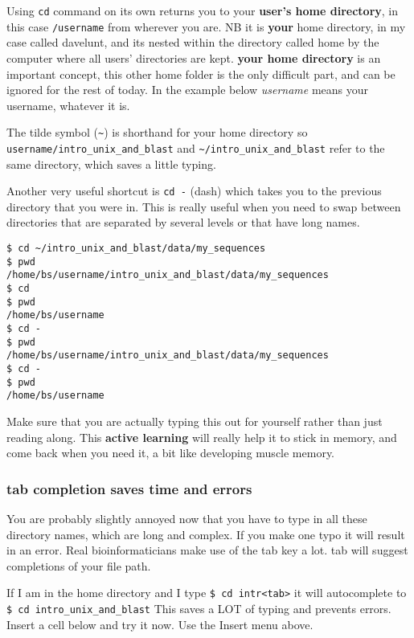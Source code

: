 \documentclass[11pt]{article}
\begin{document}
Using \texttt{cd} command on its own returns you to your \textbf{user's
home directory}, in this case \texttt{/username} from wherever you are.
NB it is \textbf{your} home directory, in my case called davelunt, and
its nested within the directory called home by the computer where all
users' directories are kept. \textbf{your home directory} is an
important concept, this other home folder is the only difficult part,
and can be ignored for the rest of today. In the example below
\emph{username} means your username, whatever it is.

The tilde symbol (\texttt{\textasciitilde{}}) is shorthand for your home
directory so \texttt{username/intro\_unix\_and\_blast} and
\texttt{\textasciitilde{}/intro\_unix\_and\_blast} refer to the same
directory, which saves a little typing.

Another very useful shortcut is \texttt{cd\ -} (dash) which takes you to
the previous directory that you were in. This is really useful when you
need to swap between directories that are separated by several levels or
that have long names.

    \begin{verbatim}
$ cd ~/intro_unix_and_blast/data/my_sequences
$ pwd
/home/bs/username/intro_unix_and_blast/data/my_sequences
$ cd
$ pwd
/home/bs/username
$ cd -
$ pwd
/home/bs/username/intro_unix_and_blast/data/my_sequences
$ cd -
$ pwd
/home/bs/username
\end{verbatim}

Make sure that you are actually typing this out for yourself rather than
just reading along. This \textbf{active learning} will really help it to
stick in memory, and come back when you need it, a bit like developing
muscle memory.

    \hypertarget{tab-completion-saves-time-and-errors}{%
\subsubsection{tab completion saves time and
errors}\label{tab-completion-saves-time-and-errors}}

    You are probably slightly annoyed now that you have to type in all these
directory names, which are long and complex. If you make one typo it
will result in an error. Real bioinformaticians make use of the tab key
a lot. tab will suggest completions of your file path.

If I am in the home directory and I type
\texttt{\$\ cd\ intr\textless{}tab\textgreater{}} it will autocomplete
to \texttt{\$\ cd\ intro\_unix\_and\_blast} This saves a LOT of typing
and prevents errors. Insert a cell below and try it now. Use the Insert
menu above.
\end{document}
